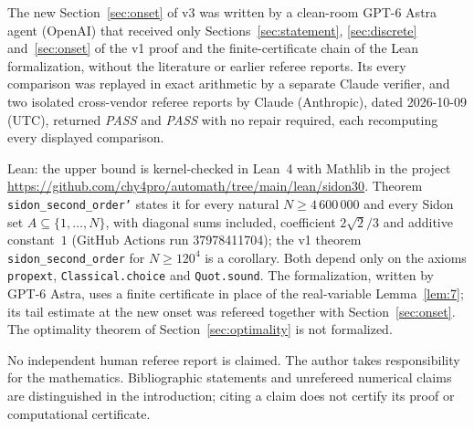 \documentclass[10pt]{article}
\numberwithin{equation}{section}
\theoremstyle{remark}
\begin{document}
The new Section~\ref{sec:onset} of v3 was written by a clean-room GPT-6
Astra agent (OpenAI) that received only Sections~\ref{sec:statement},
\ref{sec:discrete} and~\ref{sec:onset} of the v1 proof and the
finite-certificate chain of the Lean formalization, without the
literature or earlier referee reports. Its every comparison was replayed
in exact arithmetic by a separate Claude verifier, and two isolated
cross-vendor referee reports by Claude (Anthropic), dated 2026-10-09 (UTC),
returned \emph{PASS} and \emph{PASS} with no repair required, each
recomputing every displayed comparison.

Lean: the upper bound is kernel-checked in Lean~4 with Mathlib in the
project \url{https://github.com/chy4pro/automath/tree/main/lean/sidon30}.
Theorem \texttt{sidon\_second\_order'} states it for every natural
$N\ge4\,600\,000$ and every Sidon set $A\subseteq\{1,\ldots,N\}$, with
diagonal sums included, coefficient $2\sqrt2/3$ and additive constant~$1$
(GitHub Actions run 37978411704); the v1 theorem
\texttt{sidon\_second\_order} for $N\ge120^4$ is a corollary. Both depend
only on the axioms \texttt{propext}, \texttt{Classical.choice} and
\texttt{Quot.sound}. The formalization, written by GPT-6 Astra, uses a
finite certificate in place of the real-variable Lemma~\ref{lem:7}; its
tail estimate at the new onset was refereed together with
Section~\ref{sec:onset}. The optimality theorem of
Section~\ref{sec:optimality} is not formalized.

No independent human referee report is claimed. The author takes
responsibility for the mathematics. Bibliographic statements and unrefereed numerical claims
are distinguished in the introduction; citing a claim does not certify
its proof or computational certificate.
\end{document}
